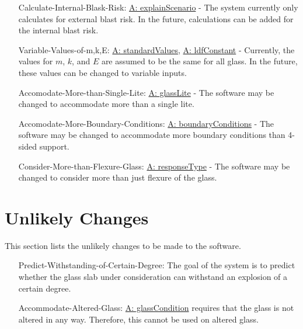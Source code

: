 \documentclass[12pt]{article}
\begin{document}
\begin{itemize}
\item[Calculate-Internal-Blask-Risk:\phantomsection\label{calcInternalBlastRisk}]{\hyperref[assumpES]{A: explainScenario} - The system currently only calculates for external blast risk. In the future, calculations can be added for the internal blast risk.}
\item[Variable-Values-of-m,k,E:\phantomsection\label{varValsOfmkE}]{\hyperref[assumpSV]{A: standardValues}, \hyperref[assumpLDFC]{A: ldfConstant} - Currently, the values for $m$, $k$, and $E$ are assumed to be the same for all glass. In the future, these values can be changed to variable inputs.}
\item[Accomodate-More-than-Single-Lite:\phantomsection\label{accMoreThanSingleLite}]{\hyperref[assumpGL]{A: glassLite} - The software may be changed to accommodate more than a single lite.}
\item[Accomodate-More-Boundary-Conditions:\phantomsection\label{accMoreBoundaryConditions}]{\hyperref[assumpBC]{A: boundaryConditions} - The software may be changed to accommodate more boundary conditions than 4-sided support.}
\item[Consider-More-than-Flexure-Glass:\phantomsection\label{considerMoreThanFlexGlass}]{\hyperref[assumpRT]{A: responseType} - The software may be changed to consider more than just flexure of the glass.}
\end{itemize}
\section{Unlikely Changes}
\label{Sec:UCs}
This section lists the unlikely changes to be made to the software.

\begin{itemize}
\item[Predict-Withstanding-of-Certain-Degree:\phantomsection\label{predictWithstandOfCertDeg}]{The goal of the system is to predict whether the glass slab under consideration can withstand an explosion of a certain degree.}
\item[Accommodate-Altered-Glass:\phantomsection\label{accAlteredGlass}]{\hyperref[assumpGC]{A: glassCondition} requires that the glass is not altered in any way. Therefore, this cannot be used on altered glass.}
\end{itemize}
\end{document}

